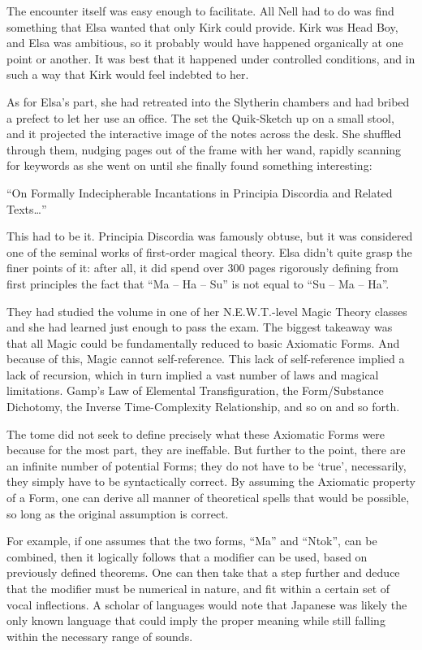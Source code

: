 The encounter itself was easy enough to facilitate. All Nell had to do was find something that Elsa wanted that only Kirk could provide. Kirk was Head Boy, and Elsa was ambitious, so it probably would have happened organically at one point or another. It was best that it happened under controlled conditions, and in such a way that Kirk would feel indebted to her.

As for Elsa’s part, she had retreated into the Slytherin chambers and had bribed a prefect to let her use an office. The set the Quik-Sketch up on a small stool, and it projected the interactive image of the notes across the desk. She shuffled through them, nudging pages out of the frame with her wand, rapidly scanning for keywords as she went on until she finally found something interesting:

“On Formally Indecipherable Incantations in Principia Discordia and Related Texts…”

This had to be it. Principia Discordia was famously obtuse, but it was considered one of the seminal works of first-order magical theory. Elsa didn’t quite grasp the finer points of it: after all, it did spend over 300 pages rigorously defining from first principles the fact that “Ma – Ha – Su” is not equal to “Su – Ma – Ha”.

They had studied the volume in one of her N.E.W.T.-level Magic Theory classes and she had learned just enough to pass the exam. The biggest takeaway was that all Magic could be fundamentally reduced to basic Axiomatic Forms. And because of this, Magic cannot self-reference. This lack of self-reference implied a lack of recursion, which in turn implied a vast number of laws and magical limitations. Gamp’s Law of Elemental Transfiguration, the Form/Substance Dichotomy, the Inverse Time-Complexity Relationship, and so on and so forth.

The tome did not seek to define precisely what these Axiomatic Forms were because for the most part, they are ineffable. But further to the point, there are an infinite number of potential Forms; they do not have to be ‘true’, necessarily, they simply have to be syntactically correct. By assuming the Axiomatic property of a Form, one can derive all manner of theoretical spells that would be possible, so long as the original assumption is correct.

For example, if one assumes that the two forms, “Ma” and “Ntok”, can be combined, then it logically follows that a modifier can be used, based on previously defined theorems. One can then take that a step further and deduce that the modifier must be numerical in nature, and fit within a certain set of vocal inflections. A scholar of languages would note that Japanese was likely the only known language that could imply the proper meaning while still falling within the necessary range of sounds.

